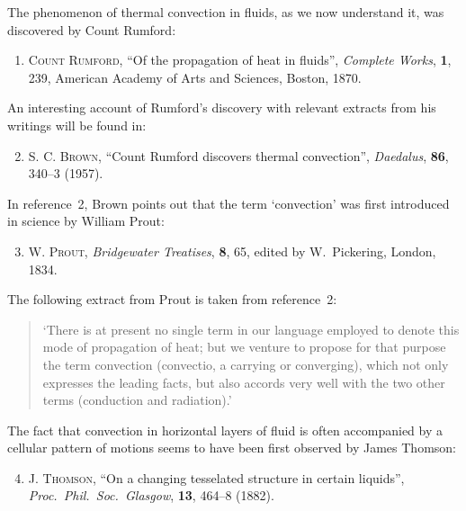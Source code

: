 The phenomenon of thermal convection in fluids, as we now understand it, was
discovered by Count Rumford:

\begin{enumerate}

\item \textsc{Count Rumford}, ``Of the propagation of heat in fluids'',
  \textit{Complete Works}, \textbf{1}, 239, American Academy of Arts and Sciences,
  Boston, 1870.

\end{enumerate}

\noindent An interesting account of Rumford's discovery with relevant extracts from his
writings will be found in:

\begin{enumerate}
\setcounter{enumi}{1}

\item \textsc{S. C. Brown}, ``Count Rumford discovers thermal convection'',
  \textit{Daedalus}, \textbf{86}, 340--3 (1957).

\end{enumerate}

\noindent In reference~2, Brown points out that the term `convection' was first introduced
in science by William Prout:

\begin{enumerate}
\setcounter{enumi}{2}

\item \textsc{W. Prout}, \textit{Bridgewater Treatises}, \textbf{8}, 65, edited by
  W.~Pickering, London, 1834.

\end{enumerate}

\noindent The following extract from Prout is taken from reference~2:

\begin{quote}
`There is at present no single term in our language employed to denote this
mode of propagation of heat; but we venture to propose for that purpose the
term convection (convectio, a carrying or converging), which not only expresses
the leading facts, but also accords very well with the two other terms (conduction
and radiation).'
\end{quote}

\noindent The fact that convection in horizontal layers of fluid is often accompanied by
a cellular pattern of motions seems to have been first observed by James Thomson:

\begin{enumerate}
\setcounter{enumi}{3}

\item \textsc{J. Thomson}, ``On a changing tesselated structure in certain liquids'',
  \textit{Proc.\ Phil.\ Soc.\ Glasgow}, \textbf{13}, 464--8 (1882).

\end{enumerate}

